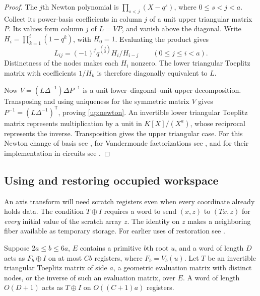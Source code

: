 \begin{proof}
The \(j\)th Newton polynomial is \(\prod_{s<j}(X-q^s)\), where
\(0\le s<j<a\). Collect its power-basis coefficients in column \(j\)
of a unit upper triangular matrix \(P\). Its values form column \(j\)
of \(L=VP\), and vanish above the diagonal. Write
\(H_i=\prod_{k=1}^i(1-q^k)\), with \(H_0=1\). Evaluating the product
gives
\[
       L_{ij}=(-1)^j q^{\binom j2}H_i/H_{i-j}
               \qquad (0\le j\le i<a).
\]
Distinctness of the nodes makes each \(H_i\) nonzero. The lower
triangular Toeplitz matrix with coefficients \(1/H_k\) is therefore
diagonally equivalent to \(L\).

Now \(V=(L\Delta^{-1})\Delta P^{-1}\) is a unit
lower--diagonal--unit upper decomposition. Transposing and using
uniqueness for the symmetric matrix \(V\) gives
\(P^{-1}=(L\Delta^{-1})^{\mathsf T}\), proving \eqref{up:newton}.
An invertible lower triangular Toeplitz matrix represents multiplication
by a unit in \(K[X]/(X^a)\), whose reciprocal represents the inverse.
Transposition gives the upper triangular case. For this Newton change
of basis see \cite[Section~5]{BostanSchost}, for Vandermonde
factorizations see \cite{orucPhillips2000,kuznetsov2018}, and for their
implementation in circuits see \cite{FiniteFourier,ExplicitFourier}.
\end{proof}

\subsection{Using and restoring occupied workspace}

An axis transform will need scratch registers even when every coordinate
already holds data. The condition \(T\oplus I\) requires a word to
send \((x,z)\) to \((Tx,z)\) for \emph{every} initial value of the
scratch array \(z\). The identity on \(z\) makes a neighboring fiber
available as temporary storage. For earlier uses of restoration see
\cite{bennett1973,BuhrmanCleveKouckyLoffSpeelman2014,ExplicitFourier}.

\begin{lemma}\label{up:toeplitz}
Suppose \(2a\le b\le6a\), \(E\) contains a primitive \(b\)th root \(u\),
and a word of length \(D\) acts as \(F_b\oplus I\) on at most \(Cb\)
registers, where \(F_b=V_b(u)\). Let \(T\) be an invertible triangular
Toeplitz matrix of side \(a\), a geometric evaluation matrix with
distinct nodes, or the inverse of such an evaluation matrix, over
\(E\). A word of length \(O(D+1)\) acts as \(T\oplus I\) on
\(O((C+1)a)\) registers.
\end{lemma}

